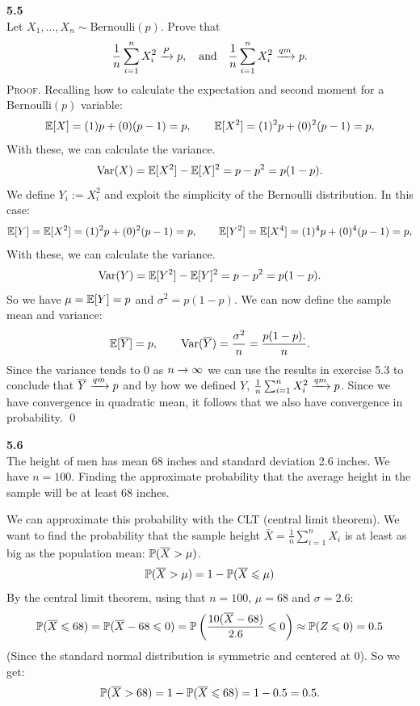 \newpage\noindent
\textbf{5.5}\\  %
Let $X_1,\ldots,X_n\sim\text{Bernoulli}(p)$. Prove that
$$
\frac{1}{n}\sum_{i=1}^n X_i^2 \raP p,
\quad\text{and}\quad
\frac{1}{n}\sum_{i=1}^n X_i^2 \raQ p.
$$
\textsc{Proof}. Recalling how to calculate the expectation and second moment
for a Bernoulli$(p)$ variable:
$$
\E[X] = (1)p + (0)(p-1) = p,
\qquad
\E[X^2] = (1)^2p + (0)^2(p-1) = p,
$$
With these, we can calculate the variance.
$$
\V(X) = \E[X^2] - \E[X]^2 = p - p^2 = p(1 - p).
$$
We define $Y_i := X_i^2$ and exploit the simplicity of the Bernoulli distribution.
In this case:
$$
\E[Y] = \E[X^2] = (1)^2p + (0)^2(p-1) = p,
\qquad
\E[Y^2] = \E[X^4] = (1)^4p + (0)^4(p-1) = p,
$$
With these, we can calculate the variance.
$$
\V(Y) = \E[Y^2] - \E[Y]^2 = p - p^2 = p(1 - p).
$$
So we have $\mu = \E[Y] = p$ and $\sigma^2 = p(1-p)$.
We can now define the sample mean and variance:
$$
\E[\bar{Y}] = p,\qquad \V(\bar{Y}) = \frac{\sigma^2}{n} = \frac{p(1 - p).}{n}.
$$
Since the variance tends to 0 as $n\ra\infty$ we can use the results in exercise 5.3
to conclude that $\bar{Y}\raQ p$ and by how we defined $Y$, $\frac{1}{n}\sum_{i=1}^n X_i^2 \raQ p$.
Since we have convergence in quadratic mean, it follows that we also have convergence
in probability. \qed

\bigskip\noindent
\textbf{5.6}\\  %
The height of men has mean 68 inches and standard deviation 2.6 inches. We have $n=100$.
Finding the approximate probability that the average height in the sample will
be at least 68 inches.

 We can approximate this probability with the CLT (central limit theorem). We want to
 find the probability that the sample height $\bar{X} = \frac{1}{n}\sum_{i=1}^n X_i$
 is at least as big as the population mean: $\P(\bar{X} > \mu)$. 
 $$
 \P(\bar{X} > \mu) =
 1 - \P(\bar{X} \leq \mu) %
 $$
 By the central limit
 theorem, using that $n=100$, $\mu = 68$ and $\sigma = 2.6$:
 $$
 \P(\bar{X} \leq 68) =
 \P(\bar{X} - 68\leq 0) =
 \P\left(\frac{10(\bar{X} - 68)}{2.6} \leq 0\right) \approx
 \P(Z\leq 0) = 0.5
 $$
 (Since the standard normal distribution is symmetric and centered at 0).
 So we get:
 $$
 \P(\bar{X} > 68) =
 1 - \P(\bar{X}\leq 68) = 1 - 0.5 = 0.5.
 $$


